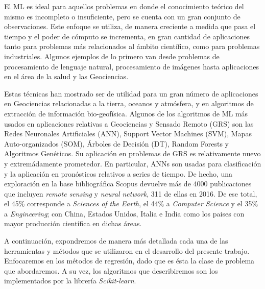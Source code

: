   \par El ML es ideal para aquellos problemas en donde el conocimiento teórico del mismo
    es incompleto o insuficiente, pero se cuenta con un gran conjunto de observaciones.
    Este enfoque se utiliza, de manera creciente a medida que pasa el tiempo y
    el poder de cómputo se incrementa, en gran cantidad de aplicaciones tanto para
    problemas más relacionados al ámbito científico, como para problemas
    industriales. Algunos ejemplos de lo primero van desde problemas de
    procesamiento de lenguaje
    natural\cite{twitt_nlp, cardellino, svm_semantic}, procesamiento de
    imágenes\cite{face_detection, corner_detection, handwritting} hasta aplicaciones
    en el área de la salud\cite{nutrition_prediction, bigdata_health, age_estimation, children}
    y las Geociencias\cite{solar_irradiation, ml_grs, modeling_mineral}.

  \par Estas técnicas han mostrado ser de utilidad para un gran número de
    aplicaciones en Geociencias relacionadas a la tierra, oceanos y atmósfera,
    y en algoritmos de extracción de información bio-geofísica.
    Algunos de los algoritmos de ML más usados en aplicaciones relativas a
    Geociencias y Sensado Remoto (GRS) son las Redes Neuronales Artificiales (ANN),
    Support Vector Machines (SVM), Mapas Auto-organizados (SOM), Árboles de Decisión (DT),
    Random Forests y Algoritmos Genéticos. Su aplicación en problemas de GRS es
    relativamente nuevo y extremádamente prometedor. En particular, ANNs son
    usadas para clasificación y la aplicación en pronósticos
    relativos a series de tiempo.
    De hecho, una exploración en la base bibliográfica Scopus devuelve más de 4000
    publicaciones que incluyen \textit{remote sensing} y \textit{neural network},
    311 de ellas en 2016. De ese total, el 45\% corresponde a
    \textit{Sciences of the Earth}, el 44\% a \textit{Computer Science} y el 35\% a
    \textit{Engineering}; con China, Estados Unidos, Italia e India como los paises
    con mayor producción científica en dichas áreas.


  \par A continuación, expondremos de manera más detallada cada una de las
    herramientas y métodos que se utilizaron en el desarrollo del presente
    trabajo. Enfocaremos en los métodos de regresión, dado que es ésta la clase
    de problema que abordaremos. A su vez, los algoritmos que describiremos son
    los implementados por la librería \textit{Scikit-learn}.

